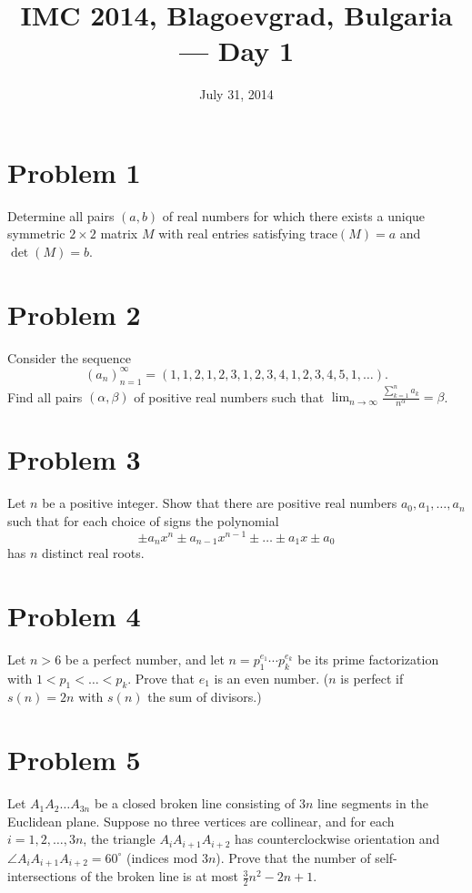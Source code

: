 \documentclass{article}
\title{IMC 2014, Blagoevgrad, Bulgaria --- Day 1}
\date{July 31, 2014}
\begin{document}
\maketitle

\section*{Problem 1}
Determine all pairs $(a,b)$ of real numbers for which there exists a unique symmetric $2 \times 2$ matrix $M$ with real entries satisfying $\mathrm{trace}(M) = a$ and $\det(M) = b$.

\section*{Problem 2}
Consider the sequence
\[ (a_n)_{n=1}^\infty = (1, 1, 2, 1, 2, 3, 1, 2, 3, 4, 1, 2, 3, 4, 5, 1, \dots). \]
Find all pairs $(\alpha, \beta)$ of positive real numbers such that $\lim_{n \to \infty} \frac{\sum_{k=1}^n a_k}{n^\alpha} = \beta$.

\section*{Problem 3}
Let $n$ be a positive integer. Show that there are positive real numbers $a_0, a_1, \dots, a_n$ such that for each choice of signs the polynomial
\[ \pm a_n x^n \pm a_{n-1} x^{n-1} \pm \dots \pm a_1 x \pm a_0 \]
has $n$ distinct real roots.

\section*{Problem 4}
Let $n > 6$ be a perfect number, and let $n = p_1^{e_1} \cdots p_k^{e_k}$ be its prime factorization with $1 < p_1 < \dots < p_k$. Prove that $e_1$ is an even number. ($n$ is perfect if $s(n) = 2n$ with $s(n)$ the sum of divisors.)

\section*{Problem 5}
Let $A_1 A_2 \dots A_{3n}$ be a closed broken line consisting of $3n$ line segments in the Euclidean plane. Suppose no three vertices are collinear, and for each $i = 1, 2, \dots, 3n$, the triangle $A_i A_{i+1} A_{i+2}$ has counterclockwise orientation and $\angle A_i A_{i+1} A_{i+2} = 60^\circ$ (indices mod $3n$). Prove that the number of self-intersections of the broken line is at most $\tfrac{3}{2} n^2 - 2n + 1$.
\end{document}
